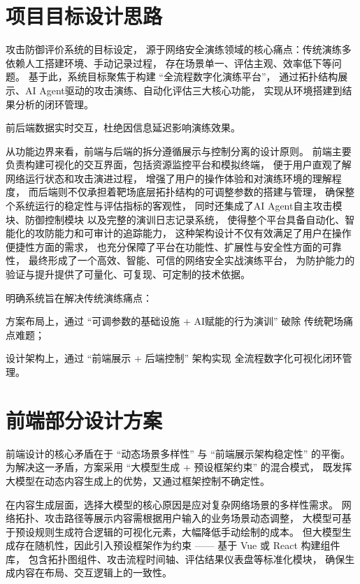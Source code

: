 \documentclass[lang=cn,10pt]{elegantbook}
\begin{document}
\section{项目目标设计思路}
攻击防御评价系统的目标设定，
源于网络安全演练领域的核心痛点：传统演练多依赖人工搭建环境、手动记录过程，
存在场景单一、评估主观、效率低下等问题。
基于此，系统目标聚焦于构建 “全流程数字化演练平台”，
通过拓扑结构展示、AI Agent驱动的攻击演练、自动化评估三大核心功能，
实现从环境搭建到结果分析的闭环管理。​

\begin{theorem}
    前后端数据实时交互，杜绝因信息延迟影响演练效果。
\end{theorem}

从功能边界来看，前端与后端的拆分遵循展示与控制分离的设计原则。
前端主要负责构建可视化的交互界面，包括资源监控平台和模拟终端，
便于用户直观了解网络运行状态和攻击演进过程，
增强了用户的操作体验和对演练环境的理解程度，
而后端则不仅承担着靶场底层拓扑结构的可调整参数的搭建与管理，
确保整个系统运行的稳定性与评估指标的客观性，
同时还集成了AI Agent自主攻击模块、防御控制模块
以及完整的演训日志记录系统，
使得整个平台具备自动化、智能化的攻防能力和可审计的追踪能力，
这种架构设计不仅有效满足了用户在操作便捷性方面的需求，
也充分保障了平台在功能性、扩展性与安全性方面的可靠性，
最终形成了一个高效、智能、可信的网络安全实战演练平台，
为防护能力的验证与提升提供了可量化、可复现、可定制的技术依据。

\begin{definition}
    明确系统旨在解决传统演练痛点：

    方案布局上，通过 “可调参数的基础设施 + AI赋能的行为演训” 破除
    传统靶场痛点难题；

    设计架构上，通过 “前端展示 + 后端控制” 架构实现
    全流程数字化可视化闭环管理。
\end{definition}

\section{前端部分设计方案}
前端设计的核心矛盾在于 “动态场景多样性” 与 “前端展示架构稳定性” 的平衡。
为解决这一矛盾，方案采用 “大模型生成 + 预设框架约束” 的混合模式，
既发挥大模型在动态内容生成上的优势，又通过框架控制不确定性。​


在内容生成层面，选择大模型的核心原因是应对复杂网络场景的多样性需求。
网络拓扑、攻击路径等展示内容需根据用户输入的业务场景动态调整，
大模型可基于预设规则生成符合逻辑的可视化元素，大幅降低手动绘制的成本。
但大模型生成存在随机性，因此引入预设框架作为约束 —— 基于 Vue 或 React 构建组件库，
包含拓扑图组件、攻击流程时间轴、评估结果仪表盘等标准化模块，
确保生成内容在布局、交互逻辑上的一致性。​
\end{document}
